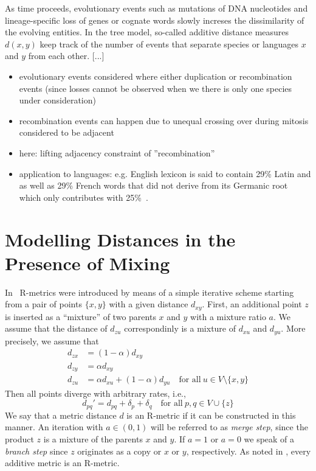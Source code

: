 \documentclass[amsmath]{lni}
\newcommand{\TODO}[1]{\begingroup\color{red}#1\endgroup}
\begin{document}
As time proceeds, evolutionary events such as mutations of DNA nucleotides
and lineage-specific loss of genes or cognate words slowly increses the
dissimilarity of the evolving entities. In the tree model, so-called
additive distance measures $d(x,y)$ keep track of the number of events that
separate species or languages $x$ and $y$ from each other. 
\TODO{[...]}





\begin{itemize}
 \item evolutionary events considered where either duplication 
 or recombination events (since losses cannot be observed when 
 we there is only one species under consideration)
 \item recombination events can happen due to unequal crossing
 over during mitosis
 considered to be adjacent
 \item here: lifting adjacency constraint of ''recombination''
 \item application to languages: e.g. English lexicon is said
 to contain 29\% Latin and as well as 29\% French words that 
 did not derive from its Germanic root which only contributes 
 with 25\%~\cite{Finkenstaedt:73}.
\end{itemize}


\section{Modelling Distances in the Presence of Mixing} 

In~\cite{Prohaska:17a} R-metrics were introduced by means of a simple
iterative scheme starting from a pair of points $\{x,y\}$ with a given
distance $d_{xy}$.  First, an additional point $z$ is inserted as a
``mixture'' of two parents $x$ and $y$ with a mixture ratio $a$. We assume
that the distance of $d_{zu}$ correspondinly is a mixture of $d_{xu}$ and
$d_{yu}$. More precisely, we assume that
\begin{equation} 
\begin{split} 
  d_{zx} & = (1-\alpha)  d_{xy} \\
  d_{zy} & =   \alpha    d_{xy} \\
  d_{zu} & =   \alpha    d_{xu} + (1-\alpha)  d_{yu} \quad\textrm{for all}\ 
                     u\in V\setminus\{ x,y \}
\end{split}
\end{equation} 
Then all points diverge with arbitrary rates, i.e., 
\begin{equation} 
  d_{pq}' = d_{pq} + \delta_p + \delta_q \quad\textrm{for all}\ 
  p,q \in V\cup\{z\} 
\end{equation} 
We say that a metric distance $d$ is an R-metric if it can be constructed
in this manner. An iteration with $a\in(0,1)$ will be referred to as
\emph{merge step}, since the product $z$ is a mixture of the parents $x$
and $y$. If $a=1$ or $a=0$ we speak of a \emph{branch step} since
$z$ originates as a copy or $x$ or $y$, respectively. As noted in
\cite{Prohaska:17a}, every additive metric is an R-metric.
\end{document}
